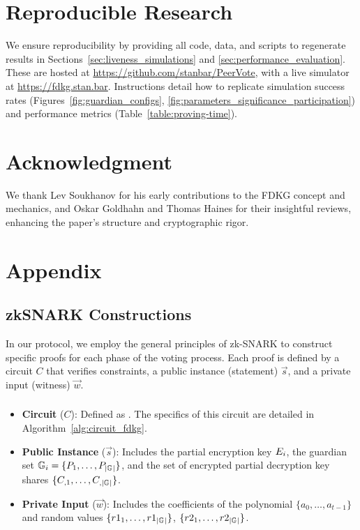 \documentclass[lettersize,journal]{IEEEtran}
\theoremstyle{definition}
\begin{document}
\section*{Reproducible Research}
We ensure reproducibility by providing all code, data, and scripts to regenerate results in Sections~\ref{sec:liveness_simulations} and \ref{sec:performance_evaluation}. These are hosted at \url{https://github.com/stanbar/PeerVote}, with a live simulator at \url{https://fdkg.stan.bar}. Instructions detail how to replicate simulation success rates (Figures~\ref{fig:guardian_configs}, \ref{fig:parameters_significance_participation}) and performance metrics (Table~\ref{table:proving-time}).

\section*{Acknowledgment}
We thank Lev Soukhanov for his early contributions to the FDKG concept and mechanics, and Oskar Goldhahn and Thomas Haines for their insightful reviews, enhancing the paper’s structure and cryptographic rigor.

\printbibliography
\section{Appendix}


\subsection{zkSNARK Constructions}\label{app:proofs}

In our protocol, we employ the general principles of zk-SNARK to construct specific proofs for each phase of the voting process. Each proof is defined by a circuit $C$ that verifies constraints, a public instance (statement) $\vec{s}$, and a private input (witness) $\vec{w}$.

\subsubsection{}\label{app:proof-fdkg}

\begin{itemize}
    \item \textbf{Circuit} ($C$): Defined as \ProofFDKGInformal{}. The specifics of this circuit are detailed in Algorithm~\ref{alg:circuit_fdkg}.
    \item \textbf{Public Instance} ($\vec{s}$): Includes the partial encryption key $E_{i}$, the guardian set $\mathbb{G}_{i} = \{P_{1},\dots,P_{|\mathbb{G}_{}|}\}$, and the set of encrypted partial decryption key shares $\{C_{,1},\dots, C_{,|\mathbb{G}_{}|}\}$.
    \item \textbf{Private Input} ($\vec{w}$): Includes the coefficients of the polynomial $\{a_0, \dots, a_{t-1}\}$ and random values $\{r1_1,\dots,r1_{|\mathbb{G}_{}|}\}$, $\{r2_1,\dots,r2_{|\mathbb{G}_{}|}\}$.
\end{itemize}
\end{document}
